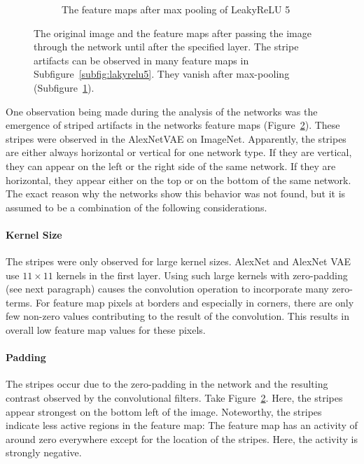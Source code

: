\begin{figure}
\begin{subfigure}{0.3\textwidth}
        \caption{The feature maps after max pooling of LeakyReLU 5}
        \label{subfig:maxpool}
    \end{subfigure}
    \caption[Feature map stripes]{The original image and the feature maps after passing the image through the network until after the specified layer. The stripe artifacts can be observed in many feature maps in Subfigure~\ref{subfig:lakyrelu5}. They vanish after max-pooling (Subfigure~\ref{subfig:maxpool}).}
    \label{fig:stripes}
\end{figure}


One observation being made during the analysis of the networks was the emergence of striped artifacts in the networks feature maps (Figure~\ref{fig:stripes}).
These stripes were observed in the AlexNetVAE on ImageNet.
Apparently, the stripes are either always horizontal or vertical for one network type.
If they are vertical, they can appear on the left or the right side of the same network.
If they are horizontal, they appear either on the top or on the bottom of the same network.
The exact reason why the networks show this behavior was not found, but it is assumed to be a combination of the following considerations.

\paragraph{Kernel Size}
The stripes were only observed for large kernel sizes.
AlexNet and AlexNet \ac{VAE} use $11\times 11$ kernels in the first layer.
Using such large kernels with zero-padding (see next paragraph) causes the convolution operation to incorporate many zero-terms.
For feature map pixels at borders and especially in corners, there are only few non-zero values contributing to the result of the convolution.
This results in overall low feature map values for these pixels.

\paragraph{Padding}
The stripes occur due to the zero-padding in the network and the resulting contrast observed by the convolutional filters.
Take Figure~\ref{fig:stripes}.
Here, the stripes appear strongest on the bottom left of the image.
Noteworthy, the stripes indicate less active regions in the feature map: The feature map has an activity of around zero everywhere except for the location of the stripes.
Here, the activity is strongly negative.

